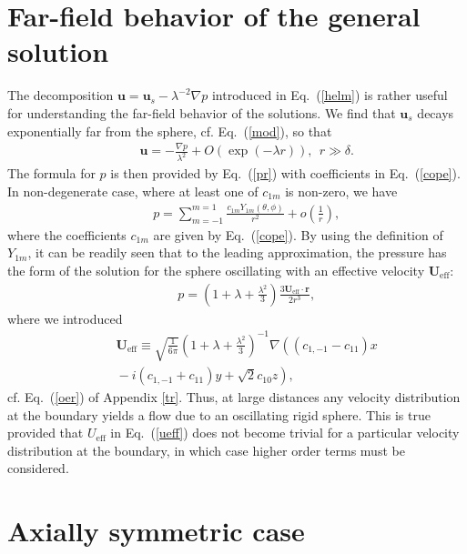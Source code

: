 \documentclass[aps,prx,twocolumn,amsmath,amssymb,amsfonts]{revtex4-2}
\begin{document}
{\section{Far-field behavior of the general solution}

The decomposition $\bm u=\bm u_s-\lambda^{-2}\nabla p$ introduced in Eq.~(\ref{helm}) is rather useful for understanding the far-field behavior of the solutions. We find that $\bm u_s$ decays exponentially far from the sphere, cf.
Eq.~(\ref{mod}), so that
\begin{eqnarray}&&
\bm u=-\frac{\nabla p}{\lambda^2}+O(\exp(-\lambda r)),\ \ r\gg \delta. \label{exp}
\end{eqnarray}
The formula for $p$ is then provided by Eq.~(\ref{pr}) with coefficients in Eq.~(\ref{cope}). In non-degenerate case, where at least one of $c_{1m}$ is non-zero, we have
\begin{eqnarray}&&\!\!\!\!\!\!\!\!\!\!\!\!\!
p=\sum_{m=-1}^{m=1}\frac{c_{1m}Y_{1m}(\theta, \phi)}{r^{2}}+o\left(\frac{1}{r}\right),
\end{eqnarray}
where the coefficients $c_{1m}$ are given by Eq.~(\ref{cope}). By using the definition of $Y_{1m}$, it can be readily seen that to the leading approximation, the pressure has the form of the solution for the sphere oscillating with an effective velocity $\bm U_\mathrm{eff}$:
\begin{eqnarray}&&
p\!=\!\left(1\!+\!\lambda\!+\!\frac{\lambda^2}{3}\right)\frac{3\bm U_\mathrm{eff}\!\cdot \!\bm r}{2r^3},
\end{eqnarray}
where we introduced
\begin{eqnarray}&&\!\!\!\!\!\!\!\!\!\!\!\!\!
\bm U_\mathrm{eff}\equiv \sqrt{\frac{1}{6\pi}} \left(1\!+\!\lambda\!+\!\frac{\lambda^2}{3}\right)^{-1}\nabla\left(
\left(c_{1, -1}\!-\!c_{11}\right)x
\right.\nonumber\\&&\!\!\!\!\!\!\!\!\!\!\!\!\!\left.
\! -\!i\left(c_{1, -1}\!+\!c_{11}\right)y\!+\!\sqrt{2}c_{10} z\right), \label{ueff}
\end{eqnarray}
cf. Eq.~(\ref{oer}) of Appendix \ref{tr}. Thus, at large distances any velocity distribution at the boundary yields a flow due to an oscillating rigid sphere. This is true provided that $U_\mathrm{eff}$ in Eq.~(\ref{ueff})  does not become trivial for a particular velocity distribution at the boundary, in which case higher order terms must be considered.

\section{Axially symmetric case}
\label{sro}

}
\end{document}
